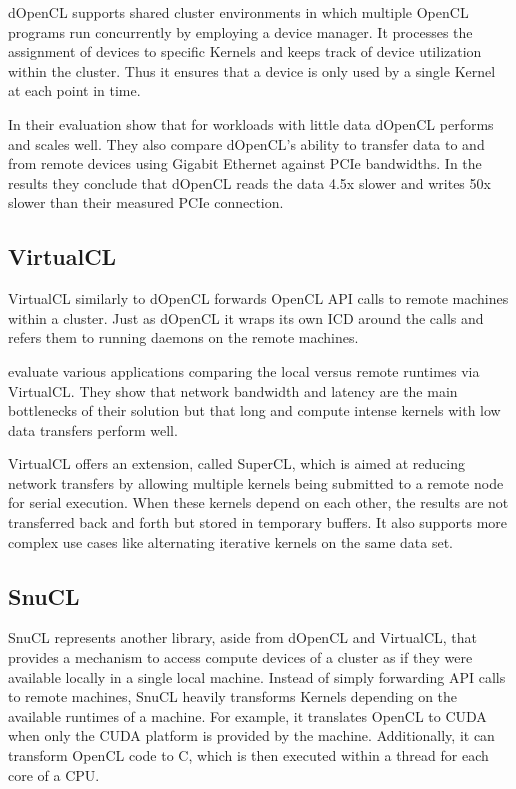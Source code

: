 dOpenCL supports shared cluster environments in which multiple OpenCL programs run concurrently by employing a device manager. It processes the assignment of devices to specific Kernels and keeps track of device utilization within the cluster. Thus it ensures that a device is only used by a single Kernel at each point in time.

In their evaluation \citeauthor{dopencl} show that for workloads with little data dOpenCL performs and scales well. They also compare dOpenCL's ability to transfer data to and from remote devices using Gigabit Ethernet against PCIe bandwidths. In the results they conclude that dOpenCL reads the data 4.5x slower and writes 50x slower than their measured PCIe connection.

\subsection*{VirtualCL}

VirtualCL similarly to dOpenCL forwards OpenCL API calls to remote machines within a cluster\cite{virtualcl}. Just as dOpenCL it wraps its own ICD around the calls and refers them to running daemons on the remote machines.

\citeauthor{virtualcl} evaluate various applications comparing the local versus remote runtimes via VirtualCL. They show that network bandwidth and latency are the main bottlenecks of their solution but that long and compute intense kernels with low data transfers perform well.

VirtualCL offers an extension, called SuperCL, which is aimed at reducing network transfers by allowing multiple kernels being submitted to a remote node for serial execution. When these kernels depend on each other, the results are not transferred back and forth but stored in temporary buffers. It also supports more complex use cases like alternating iterative kernels on the same data set.

\subsection*{SnuCL}

SnuCL represents another library, aside from dOpenCL and VirtualCL, that provides a mechanism to access compute devices of a cluster as if they were available locally in a single local machine\cite{snucl}. Instead of simply forwarding API calls to remote machines, SnuCL heavily transforms Kernels depending on the available runtimes of a machine. For example, it translates OpenCL to CUDA when only the CUDA platform is provided by the machine. Additionally, it can transform OpenCL code to C, which is then executed within a thread for each core of a CPU.

